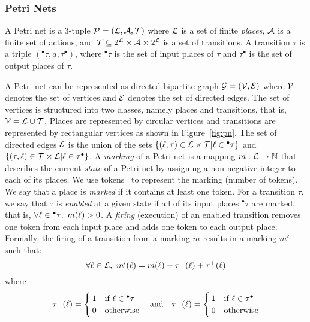 \subsubsection{Petri Nets}
\begin{definition}\label{def:pn}
  A Petri net is a 3-tuple $\mathcal{P}=(\mathcal{L},\mathcal{A},\mathcal{T})$ where $\mathcal{L}$ is a set of finite
  \emph{places}, $\mathcal{A}$ is a finite set of actions, and $\mathcal{T}\subseteq 2^{\mathcal{L}}\times
  \mathcal{A}\times 2^{\mathcal{L}}$ is a set of transitions. A transition $\tau$ is a triple 
  $(^\bullet\tau,a, \tau^{\bullet})$, where $^\bullet\tau$ is the set of input places of 
  $\tau$ and $\tau^{\bullet}$ is 
  the set of output places of $\tau$.
\end{definition}

A Petri net can be represented as directed bipartite graph $\mathcal{G}=(\mathcal{V},\mathcal{E})$ where 
$\mathcal{V}$ denotes the set of vertices and $\mathcal{E}$ denotes the set of directed edges. 
The set of vertices is structured into two classes, namely places and transitions, 
that is, $\mathcal{V}=\mathcal{L}\cup\mathcal{T}$. 
Places are represented by circular vertices and transitions are represented by rectangular 
vertices as shown in Figure~\ref{fig:pn}. 
The set of directed edges $\mathcal{E}$ is the union of the sets $\{(\ell,\tau)\in\mathcal{L}\times\mathcal{T}|
\ell\in{^\bullet\tau}\}$ and $\{(\tau,\ell)\in\mathcal{T}\times\mathcal{L}|\ell\in\tau^\bullet\}$.
A \emph{marking} of a Petri net is a mapping $m:\mathcal{L}\to\mathbb{N}$ that describes the current
\emph{state} of a Petri net by assigning a non-negative integer to each of its places.
We use tokens~\cite{} to represent the marking (number of tokens). We say that a place is
\emph{marked} if it contains at least one token.
For a transition $\tau$, we say that $\tau$ is \emph{enabled} at a given state if all of 
its input places $^\bullet\tau$ are marked, that is, $\forall\loc\in{^\bullet\tau},\ m(\loc)>0$.
A \emph{firing} (execution) of an enabled transition removes one token from each input place
and adds one token to each output place. Formally, the firing of a transition from a marking 
$m$ results in a marking $m'$ such that:
\begin{displaymath}
  \forall\loc\in\Loc, \ m'(\loc)=m(\loc)-\tau^{-}(\loc)+\tau^{+}(\loc) 
\end{displaymath}
where
\begin{displaymath}
  \tau^{-}(\ell)=\begin{cases}
    1 & \text{if }\ell\in{^\bullet\tau}\\
    0 & \text{otherwise} 
  \end{cases}
 \quad \text{and}\quad
\tau^{+}(\ell)=\begin{cases}
    1 & \text{if }\ell\in{\tau^\bullet }\\
    0 & \text{otherwise} 
\end{cases}\end{displaymath}


